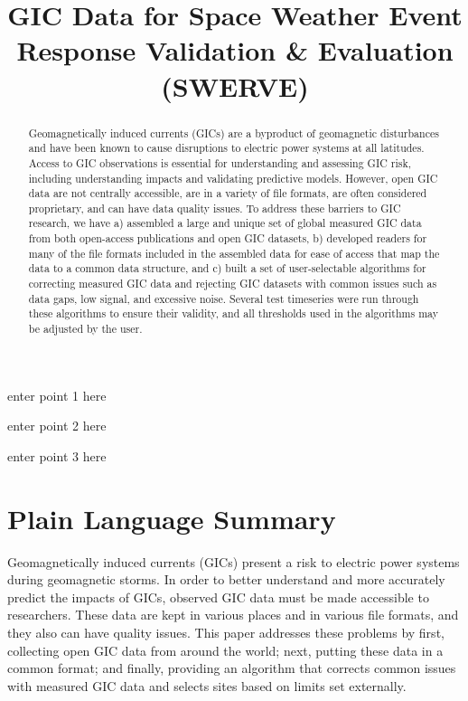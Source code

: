 \documentclass[draft]{agujournal2019}
\begin{document}
\title{GIC Data for Space Weather Event Response Validation \& Evaluation (SWERVE)}










\begin{keypoints}
\item enter point 1 here
\item enter point 2 here
\item enter point 3 here
\end{keypoints}


\begin{abstract}
Geomagnetically induced currents (GICs) are a byproduct of geomagnetic disturbances and have been known to cause disruptions to electric power systems at all latitudes. Access to GIC observations is essential for understanding and assessing GIC risk, including understanding impacts and validating predictive models. However, open GIC data are not centrally accessible, are in a variety of file formats, are often considered proprietary, and can have data quality issues. To address these barriers to GIC research, we have a) assembled a large and unique set of global measured GIC data from both open-access publications and open GIC datasets, b) developed readers for many of the file formats included in the assembled data for ease of access that map the data to a common data structure, and c) built a set of user-selectable algorithms for correcting measured GIC data and rejecting GIC datasets with common issues such as data gaps, low signal, and excessive noise. Several test timeseries were run through these algorithms to ensure their validity, and all thresholds used in the algorithms may be adjusted by the user. 
\end{abstract}

\section*{Plain Language Summary}
Geomagnetically induced currents (GICs) present a risk to electric power systems during geomagnetic storms. In order to better understand and more accurately predict the impacts of GICs, observed GIC data must be made accessible to researchers. These data are kept in various places and in various file formats, and they also can have quality issues. This paper addresses these problems by first, collecting open GIC data from around the world; next, putting these data in a common format; and finally, providing an algorithm that corrects common issues with measured GIC data and selects sites based on limits set externally.
\end{document}
